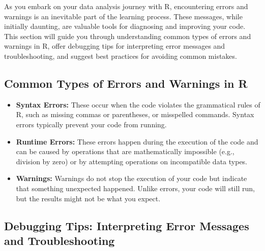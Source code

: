 \documentclass[
]{book}
\begin{document}
As you embark on your data analysis journey with R, encountering errors and warnings is an inevitable part of the learning process. These messages, while initially daunting, are valuable tools for diagnosing and improving your code. This section will guide you through understanding common types of errors and warnings in R, offer debugging tips for interpreting error messages and troubleshooting, and suggest best practices for avoiding common mistakes.

\subsection*{Common Types of Errors and Warnings in R}\label{common-types-of-errors-and-warnings-in-r}

\begin{itemize}
\item
  \textbf{Syntax Errors:} These occur when the code violates the grammatical rules of R, such as missing commas or parentheses, or misspelled commands. Syntax errors typically prevent your code from running.
\item
  \textbf{Runtime Errors:} These errors happen during the execution of the code and can be caused by operations that are mathematically impossible (e.g., division by zero) or by attempting operations on incompatible data types.
\item
  \textbf{Warnings:} Warnings do not stop the execution of your code but indicate that something unexpected happened. Unlike errors, your code will still run, but the results might not be what you expect.
\end{itemize}

\subsection{Debugging Tips: Interpreting Error Messages and Troubleshooting}\label{debugging-tips-interpreting-error-messages-and-troubleshooting}
\end{document}
